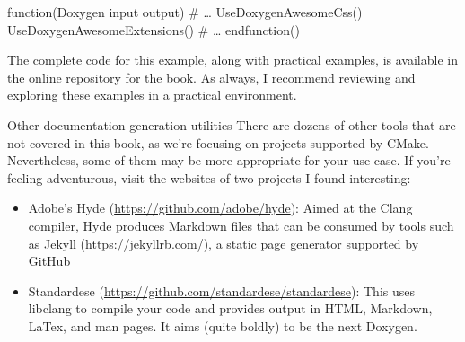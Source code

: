 \begin{cmake}
function(Doxygen input output)
# …
    UseDoxygenAwesomeCss()
    UseDoxygenAwesomeExtensions()
# …
endfunction()
\end{cmake}

The complete code for this example, along with practical examples, is available in the online repository for the book. As always, I recommend reviewing and exploring these examples in a practical environment.

\begin{myNotic}{Other documentation generation utilities}
There are dozens of other tools that are not covered in this book, as we’re focusing on projects supported by CMake. Nevertheless, some of them may be more appropriate for your use case. If you’re feeling adventurous, visit the websites of two projects I found interesting:

\begin{itemize}
\item
Adobe’s Hyde (\url{https://github.com/adobe/hyde}): Aimed at the Clang compiler, Hyde produces Markdown files that can be consumed by tools such as Jekyll (https://jekyllrb.com/), a static page generator supported by GitHub

\item
Standardese (\url{https://github.com/standardese/standardese}): This uses libclang to compile your code and provides output in HTML, Markdown, LaTex, and man pages. It aims (quite boldly) to be the next Doxygen.
\end{itemize}
\end{myNotic}










































